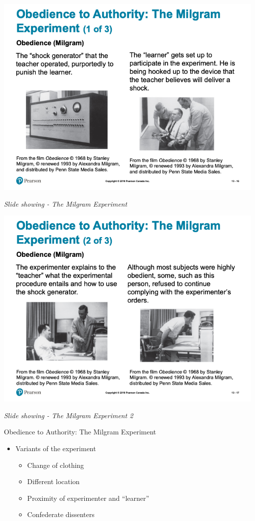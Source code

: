 \documentclass[
]{book}
\providecommand{\tightlist}{%
  \setlength{\itemsep}{0pt}\setlength{\parskip}{0pt}}
\begin{document}
\begin{reflect}
\includegraphics{assets/unit_6/slide_16.png}

\emph{Slide showing - The Milgram Experiment}

\includegraphics{assets/unit_6/slide_17.png}

\emph{Slide showing - The Milgram Experiment 2}

Obedience to Authority: The Milgram Experiment

\begin{itemize}
\tightlist
\item
  Variants of the experiment

  \begin{itemize}
  \tightlist
  \item
    Change of clothing\\
  \item
    Different location\\
  \item
    Proximity of experimenter and ``learner''\\
  \item
    Confederate dissenters
  \end{itemize}
\end{itemize}


\end{reflect}
\end{document}
